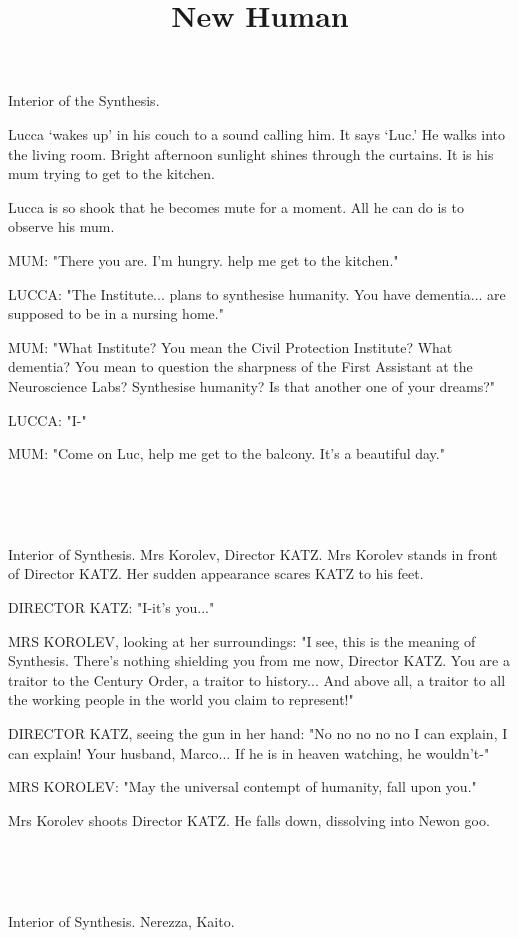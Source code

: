\documentclass[11pt]{article}
\begin{document}
\ttfamily
\title{New Human}
\maketitle

Interior of the Synthesis.


Lucca `wakes up' in his couch to a sound calling him. 
It says `Luc.'
He walks into the living room. 
Bright afternoon sunlight shines through the curtains.
It is his mum trying to get to the kitchen.

Lucca is so shook that he becomes mute for a moment.
All he can do is to observe his mum.

MUM: "There you are.
I'm hungry.
help me get to the kitchen."

LUCCA: "The Institute... plans to synthesise humanity.
You have dementia... are supposed to be in a nursing home."

MUM: "What Institute? You mean the Civil Protection Institute? What dementia?
You mean to question the sharpness of the First Assistant at the Neuroscience Labs?
Synthesise humanity?
Is that another one of your dreams?"

LUCCA: "I-"

MUM: "Come on Luc, help me get to the balcony. It's a beautiful day."

\ 

\ 

Interior of Synthesis.
Mrs Korolev, Director KATZ.
Mrs Korolev stands in front of Director KATZ. 
Her sudden appearance scares KATZ to his feet.

DIRECTOR KATZ: "I-it's you..."

MRS KOROLEV, looking at her surroundings: "I see, this is the meaning of Synthesis.
There's nothing shielding you from me now, Director KATZ.
You are a traitor to the Century Order, a traitor to history...
And above all, a traitor to all the working people in the world you claim to represent!"

DIRECTOR KATZ, seeing the gun in her hand: "No no no no no I can explain, I can explain! 
Your husband, Marco...
If he is in heaven watching, he wouldn't-"

MRS KOROLEV: "May the universal contempt of humanity, fall upon you."

Mrs Korolev shoots Director KATZ.
He falls down, dissolving into Newon goo.

\ 

\ 

Interior of Synthesis.
Nerezza, Kaito. 
\end{document}
